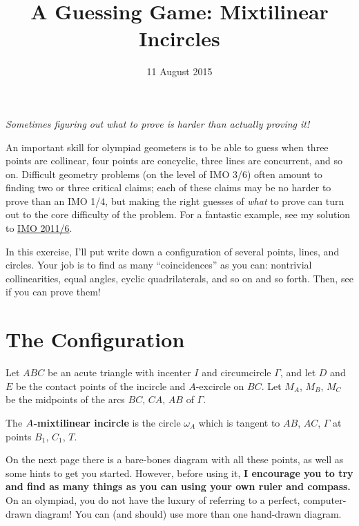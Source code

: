 \documentclass[11pt]{scrartcl}
\begin{document}
\title{A Guessing Game: Mixtilinear Incircles}
\date{11 August 2015}
\maketitle

\begin{center}
  \itshape
  Sometimes figuring out what to prove is harder than actually proving it!
\end{center}

An important skill for olympiad geometers is to be able to guess when three points are collinear,
four points are concyclic, three lines are concurrent, and so on.
Difficult geometry problems (on the level of IMO 3/6) often amount to finding two or three critical claims;
each of these claims may be no harder to prove than an IMO 1/4,
but making the right guesses of \emph{what} to prove
can turn out to the core difficulty of the problem.
For a fantastic example, see my solution to
\href{http://www.aops.com/community/c6h418983p3518149}{IMO 2011/6}.

In this exercise, I'll put write down a configuration of several points, lines, and circles.
Your job is to find as many ``coincidences'' as you can: nontrivial collinearities, equal angles,
cyclic quadrilaterals, and so on and so forth.
Then, see if you can prove them!

\tableofcontents

\section{The Configuration}
\begin{tcolorbox}[plainbox]
  Let $ABC$ be an acute triangle with incenter $I$ and circumcircle $\Gamma$,
  and let $D$ and $E$ be the contact points of the incircle and $A$-excircle on $BC$.
  Let $M_A$, $M_B$, $M_C$ be the midpoints of the arcs $BC$, $CA$, $AB$ of $\Gamma$.

  The \textbf{$\boldmath A$-mixtilinear incircle} is the circle $\omega_A$ which is
  tangent to $AB$, $AC$, $\Gamma$ at points $B_1$, $C_1$, $T$.
\end{tcolorbox}

On the next page there is a bare-bones diagram with all these points,
as well as some hints to get you started.
However, before using it, \textbf{I encourage you to try and find as many things as you can
using your own ruler and compass.}
On an olympiad, you do not have the luxury of referring to a perfect, computer-drawn diagram!
You can (and should) use more than one hand-drawn diagram.
\end{document}
